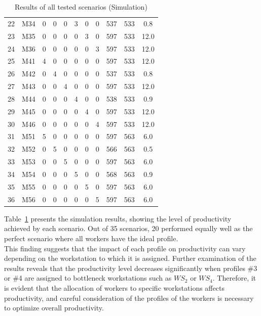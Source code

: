 \documentclass[review,12pt, 3p, times]{elsarticle}
\begin{document}
\begin{table}[htbp]
\begin{center}
\begin{longtable}{|cc|cccccc|ccc|}
			22 & M34 & 0 & 0 & 0 & 3 & 0 & 0 & 537 & 533 & 0.8  \\
			23 & M35 & 0 & 0 & 0 & 0 & 3 & 0 & 597 & 533 & 12.0 \\
			24 & M36 & 0 & 0 & 0 & 0 & 0 & 3 & 597 & 533 & 12.0 \\
			\hline
			25 & M41 & 4 & 0 & 0 & 0 & 0 & 0 & 597 & 533 & 12.0 \\
			26 & M42 & 0 & 4 & 0 & 0 & 0 & 0 & 537 & 533 & 0.8  \\
			27 & M43 & 0 & 0 & 4 & 0 & 0 & 0 & 597 & 533 & 12.0 \\
			28 & M44 & 0 & 0 & 0 & 4 & 0 & 0 & 538 & 533 & 0.9  \\
			29 & M45 & 0 & 0 & 0 & 0 & 4 & 0 & 597 & 533 & 12.0 \\
			30 & M46 & 0 & 0 & 0 & 0 & 0 & 4 & 597 & 533 & 12.0 \\
			\hline
			31 & M51 & 5 & 0 & 0 & 0 & 0 & 0 & 597 & 563 & 6.0  \\
			32 & M52 & 0 & 5 & 0 & 0 & 0 & 0 & 566 & 563 & 0.5  \\
			33 & M53 & 0 & 0 & 5 & 0 & 0 & 0 & 597 & 563 & 6.0  \\
			34 & M54 & 0 & 0 & 0 & 5 & 0 & 0 & 568 & 563 & 0.9  \\
			35 & M55 & 0 & 0 & 0 & 0 & 5 & 0 & 597 & 563 & 6.0  \\
			36 & M56 & 0 & 0 & 0 & 0 & 0 & 5 & 597 & 563 & 6.0  \\
			\hline
		\end{longtable}
		\caption{Results of all tested scenarios (Simulation)}
		\label{tab:t0}
	\end{center}
\end{table}
	
Table~\ref{tab:t0} presents the simulation results, showing the level of productivity achieved by each scenario. Out of 35 scenarios, 20 performed equally well as the perfect scenario where all workers have the ideal profile.
\\
This finding suggests that the impact of each profile on productivity can vary depending on the workstation to which it is assigned. Further examination of the results reveals that the productivity level decreases significantly when profiles \#3 or \#4 are assigned to bottleneck workstations such as $\textit{WS}_2$ or $\textit{WS}_4$. Therefore, it is evident that the allocation of workers to specific workstations affects productivity, and careful consideration of the profiles of the workers is necessary to optimize overall productivity.
	
\end{document}
